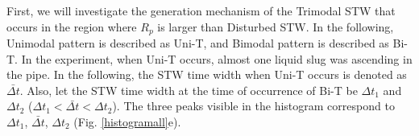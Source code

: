 \documentclass[aps,pre,preprint,groupedaddress,showkeys]{revtex4-2}
\begin{document}
First, we will investigate the generation mechanism of the Trimodal STW that occurs in the region where $ R_p $ is larger than Disturbed STW.
In the following, Unimodal pattern is described as Uni-T, and Bimodal pattern is described as Bi-T.
In the experiment, when Uni-T occurs, almost one liquid slug was ascending in the pipe.
In the following, the STW time width when Uni-T occurs is denoted as $ \bar {\Delta t} $.
Also, let the STW time width at the time of occurrence of Bi-T be $ \Delta t_1 $ and $ \Delta t_2 $ ($ \Delta t_1 <\bar {\Delta t} <\Delta t_2 $).
The three peaks visible in the histogram correspond to $ \Delta t_1 $, $ \bar {\Delta t} $, $ \Delta t_2 $ (Fig. \ref{histogramall}e).
\end{document}
